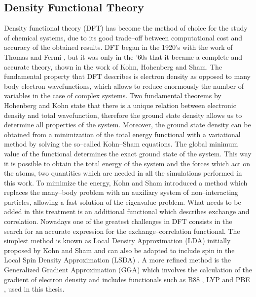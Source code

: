 \subsection*{Density Functional Theory}
Density functional theory (DFT) has become the method of choice for the study of chemical systems, due to its good trade--off between computational cost and accuracy of the obtained results. DFT began in the 1920’s with the work of Thomas and Fermi \cite{Thomas1927, Fermi1928}, but it was only in the ’60s that it became a complete and accurate theory, shown in the work of Kohn, Hohenberg and Sham\cite{Hohenberg1964}. The fundamental property that DFT describes is electron density as opposed to many body electron wavefunctions, which allows to reduce enormously the number of variables in the case of complex systems. Two fundamental theorems by Hohenberg and Kohn state that there is a unique relation between electronic density and total wavefunction, therefore the ground state density allows us to determine all properties of the system. Moreover, the ground state density can be obtained from a minimization of the total energy functional with a variational method by solving the so--called Kohn--Sham equations. The global minimum value of the functional determines the exact ground state of the system. This way it is possible to obtain the total energy of the system and the forces which act on the atoms, two quantities which are needed in all the simulations performed in this work. 
\npar
To mimimize the energy, Kohn and Sham \cite{Kohn1965} introduced a method which replaces the many--body problem with an auxiliary system of non--interacting particles, allowing a fast solution of the eigenvalue problem. What needs to be added in this treatment is an additional functional which describes exchange and correlation. Nowadays one of the greatest challenges in DFT consists in the search for an accurate expression for the exchange--correlation functional.
The simplest method is known as Local Density Approximation (LDA) initially proposed by Kohn and Sham \cite{Kohn1965} and can also be adapted to include spin in the Local Spin Density Approximation (LSDA) \cite{Vosko1980}. A more refined method is the Generalized Gradient Approximation (GGA) which involves the calculation of the gradient of electron density and includes functionals such as B88 \cite{Becke1988}, LYP \cite{Lee1988} and PBE \cite{Perdew1996, Perdew1997}, used in this thesis. 
